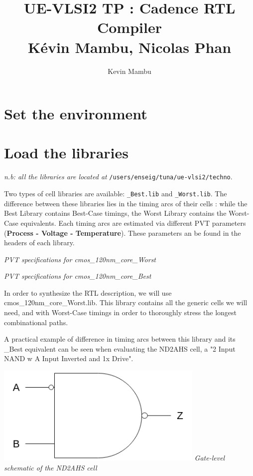 \documentclass[a4paper]{article}
\author{Kevin Mambu}
\title{UE-VLSI2 TP : Cadence RTL Compiler \\ Kévin Mambu, Nicolas Phan}
\def\code#1{\texttt{#1}}
\begin{document}
\maketitle

\section{Set the environment}




\section{Load the libraries}

{\it n.b: all the libraries are located at} \code{/users/enseig/tuna/ue-vlsi2/techno}.

Two types of cell libraries are available:
\code{\_Best.lib} and \code{\_Worst.lib}. The difference between these libraries
lies in the timing arcs of their cells : while the Best Library contains Best-Case timings,
the Worst Library contains the Worst-Case equivalents. Each timing arcs are estimated via
different PVT parameters (\textbf{Process - Voltage - Temperature}). These parameters an be
found in the headers of each library.


\begin{center}
  \it{PVT specifications for cmos\_120nm\_core\_Worst}
\end{center}

\newpage


\begin{center}
  \it{PVT specifications for cmos\_120nm\_core\_Best}
\end{center}

In order to synthesize the RTL description, we will use cmos\_120nm\_core\_Worst.lib.
This library contains all the generic cells we will need, and with Worst-Case timings
in order to thoroughly stress the longest combinational paths.

A practical example of difference in timing arcs between this library and its \_Best
equivalent can be seen when evaluating the ND2AHS cell, a "2 Input NAND w\/ A Input
Inverted and 1x Drive".

\begin{center}
  \hspace{6em}
  \includegraphics[width=10cm]{./nd2ahs.png} \newline
  \it{Gate-level schematic of the ND2AHS cell}
\end{center}
\end{document}
